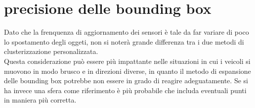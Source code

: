 \documentclass[italian]{report}
\begin{document}
\section{precisione delle bounding box}
Dato che la frenquenza di aggiornamento dei sensori è tale da far variare di poco lo spostamento degli oggeti, non si noterà grande differenza tra i due metodi di clusterizzazione personalizzata.\\
Questa considerazione può essere più impattante nelle situazioni in cui i veicoli si muovono in modo brusco e in direzioni diverse, in quanto il metodo di espansione delle bounding box potrebbe non essere in grado di reagire adeguatamente. Se si ha invece una sfera come riferimento è più probabile che includa eventuali punti in maniera più corretta.\\

\newpage
\end{document}
